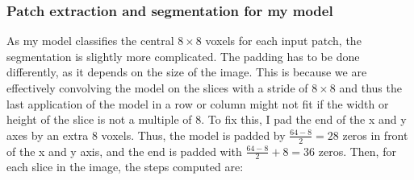 \documentclass[12pt,a4paper,twoside,openright]{report}
\begin{document}
\subsubsection{Patch extraction and segmentation for my model}
As my model classifies the central $8 \times 8$ voxels for each input patch, the segmentation is slightly more complicated. The padding has to be done differently, as it depends on the size of the image. This is because we are effectively convolving the model on the slices with a stride of $8 \times 8$ and thus the last application of the model in a row or column might not fit if the width or height of the slice is not a multiple of 8. To fix this, I pad the end of the x and y axes by an extra 8 voxels. Thus, the model is padded by $\frac{64 - 8}{2} = 28$ zeros in front of the x and y axis, and the end is padded with $\frac{64 -8}{2} + 8 = 36$ zeros. Then, for each slice in the image, the steps computed are:
\end{document}
